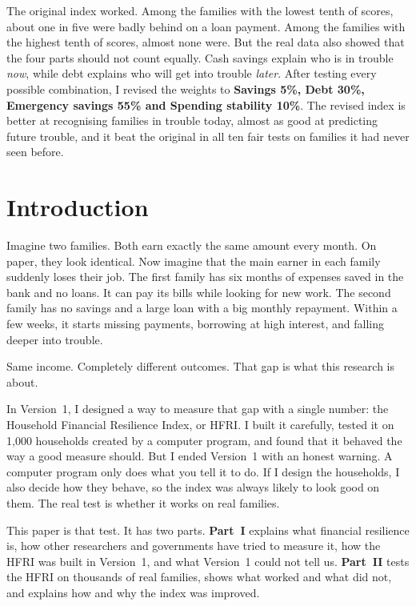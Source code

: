 \documentclass[11pt,a4paper]{article}
\newcommand{\pct}{\%}
\begin{document}
The original index worked. Among the families with the lowest tenth of scores, about one in five were badly behind on
a loan payment. Among the families with the highest tenth of scores, almost none were. But the real data also showed
that the four parts should not count equally. Cash savings explain who is in trouble \emph{now}, while debt explains
who will get into trouble \emph{later}. After testing every possible combination, I revised the weights to
\textbf{Savings 5\pct, Debt 30\pct, Emergency savings 55\pct{} and Spending stability 10\pct}. The revised index is
better at recognising families in trouble today, almost as good at predicting future trouble, and it beat the original
in all ten fair tests on families it had never seen before.

\section{Introduction}
Imagine two families. Both earn exactly the same amount every month. On paper, they look identical. Now imagine that
the main earner in each family suddenly loses their job. The first family has six months of expenses saved in the bank
and no loans. It can pay its bills while looking for new work. The second family has no savings and a large loan with
a big monthly repayment. Within a few weeks, it starts missing payments, borrowing at high interest, and falling deeper
into trouble.

Same income. Completely different outcomes. That gap is what this research is about.

In Version~1, I designed a way to measure that gap with a single number: the Household Financial Resilience Index, or
HFRI. I built it carefully, tested it on 1,000 households created by a computer program, and found that it behaved the
way a good measure should. But I ended Version~1 with an honest warning. A computer program only does what you tell it
to do. If I design the households, I also decide how they behave, so the index was always likely to look good on them.
The real test is whether it works on real families.

This paper is that test. It has two parts. \textbf{Part~I} explains what financial resilience is, how other
researchers and governments have tried to measure it, how the HFRI was built in Version~1, and what Version~1 could not
tell us. \textbf{Part~II} tests the HFRI on thousands of real families, shows what worked and what did not, and explains
how and why the index was improved.
\end{document}
